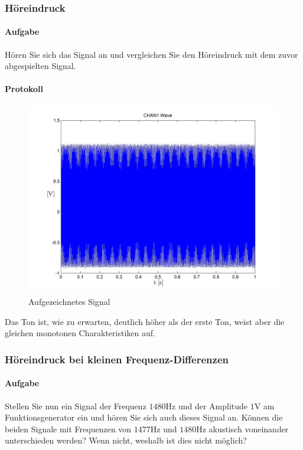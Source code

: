 \documentclass[10pt]{scrreprt}
\begin{document}
        \subsubsection{Höreindruck}
        \paragraph{Aufgabe}
        Hören Sie sich das Signal an und vergleichen Sie den Höreindruck mit dem zuvor
        abgespielten Signal.
        \paragraph{Protokoll}
        \begin{center}
            \begin{figure}[H]
                \includegraphics[width=\textwidth]{Screenshot_GUI_4132_chan1_wave.jpg}
              \caption{Aufgezeichnetes Signal}
            \end{figure}
        \end{center}

        Das Ton ist, wie zu erwarten, deutlich höher als der erste Ton, weist aber
        die gleichen monotonen Charakteristiken auf.

        \subsubsection{Höreindruck bei kleinen Frequenz-Differenzen}
        \paragraph{Aufgabe}
        Stellen Sie nun ein Signal der Frequenz $1480\si{\hertz}$ und der Amplitude $1\si{\volt}$ am Funktionsgenerator
        ein und hören Sie sich auch dieses Signal an. Können die beiden
        Signale mit Frequenzen von $1477\si{\hertz}$ und $1480\si{\hertz}$ akustisch voneinander unterschieden
        werden? Wenn nicht, weshalb ist dies nicht möglich?
\end{document}
